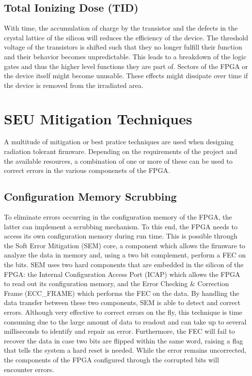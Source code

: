     \subsection{Total Ionizing Dose (TID)}

      With time, the accumulation of charge by the transistor and the defects in the crystal lattice of the silicon will reduces the efficiency of the device. The threshold voltage of the transistors is shifted such that they no longer fulfill their function and their behavior becomes unpredictable. This leads to a breakdown of the logic gates and thus the higher level functions they are part of. Sectors of the FPGA or the device itself might become unusable. These effects might dissipate over time if the device is removed from the irradiated area.

  \section{SEU Mitigation Techniques}

    A multitude of mitigation or best pratice techniques are used when designing radiation tolerant firmware. Depending on the requirements of the project and the available resources, a combination of one or more of these can be used to correct errors in the various componenets of the FPGA.

    \subsection{Configuration Memory Scrubbing}

      To eliminate errors occurring in the configuration memory of the FPGA, the latter can implement a scrubbing mechanism. To this end, the FPGA needs to access its own configuration memory during run time. This is possible through the Soft Error Mitigation (SEM) core, a component which allows the firmware to analyze the data in memory and, using a two bit complement, perform a FEC on the bits. SEM uses two hard components that are embedded in the silicon of the FPGA: the Internal Configuration Access Port (ICAP) which allows the FPGA to read out its configuration memory, and the Error Checking \& Correction Frame (ECC\_FRAME) which performs the FEC on the data. By handling the data transfer between these two components, SEM is able to detect and correct errors. Although very effective to correct errors on the fly, this technique is time consuming due to the large amount of data to readout and can take up to several milliseconds to identify and repair an error. Furthermore, the FEC will fail to recover the data in case two bits are flipped within the same word, raising a flag that tells the system a hard reset is needed. While the error remains uncorrected, the components of the FPGA configured through the corrupted bits will encounter errors.

